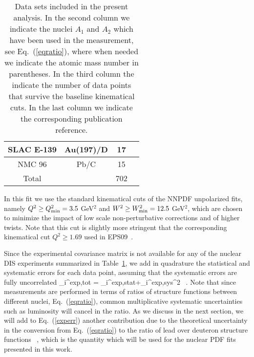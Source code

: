 \begin{table}[t]
\begin{tabular}{c c c c}
\hline
  SLAC E-139 & Au(197)/D & 17 & \cite{PhysRevD.49.4348}\\
\hline
 NMC 96 & Pb/C & 15 & \cite{Arneodo:1996rv}\\
 \hline
 \hline
 Total & & 702 & \\
\hline
\end{tabular}
\caption{\small Data sets included in the present analysis.
  In the second column we indicate the nuclei $A_1$ and $A_2$ which
  have been used in the measurement, see Eq.~(\ref{eqratio}),
  where when needed we indicate the atomic mass
  number in  parentheses.
  In the third column the indicate the number of data points that
  survive the baseline kinematical cuts.
  In the last column we indicate the corresponding publication reference.
}
\label{dataset}
\end{table}


In this fit we use the standard kinematical cuts of the NNPDF unpolarized
fits, namely $Q^2 \ge Q^2_{\rm min}=3.5$ GeV$^2$ and $W^2 \ge W^2_{\rm min}=12.5$
GeV$^2$, which are chosen to minimize the impact of low scale non-perturbative
corrections and of higher twists.
%
Note that this cut is slightly more stringent that the
corresponding kinematical cut $Q^2 \ge 1.69$  used in
EPS09~\cite{Eskola:2009uj}.



Since the experimental covariance matrix is not available for any of
the nuclear DIS experiments summarized in Table~\ref{dataset},
we add in quadrature the statistical and systematic errors for each
data point, assuming that the systematic errors are fully uncorrelated
\be
\label{experr}
\sigma_i^{\rm exp,tot} = \lp \sigma_i^{\rm exp,stat}+\sigma_i^{\rm exp,sys}\rp^2 \, .
\ee
Note that since measurements are performed in terms of ratios of
structure functions between different nuclei, Eq.~(\ref{eqratio}),
common multiplicative systematic uncertainties such as luminosity will
cancel in the ratio.
%
As we discuss in the next section, we will add to
Eq.~(\ref{experr}) another contribution due to the theoretical
uncertainty in the conversion from Eq.~(\ref{eqratio}) to the ratio
of lead over deuteron structure functions
\be
\label{eqratio2}
 \, ,
\ee
which is the quantity which will be used for the nuclear
PDF fits presented in this work.

